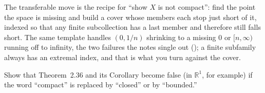 \documentclass[main.tex]{subfiles}
\begin{document}
\begin{Reflection}
The transferable move is the recipe for ``show $X$ is not compact'': find the point the space is missing
and build a cover whose members each stop just short of it, indexed so that any finite subcollection has
a last member and therefore still falls short. The same template handles $(0,1/n)$ shrinking to a
missing $0$ or $[n,\infty)$ running off to infinity, the two failures the notes single out
(); a finite subfamily always has an extremal index, and that is what you turn against the
cover.
\end{Reflection}

Show that Theorem~2.36 and its Corollary become false (in $\mathbb R^{1}$, for example) if the word
``compact'' is replaced by ``closed'' or by ``bounded.''
\end{document}
